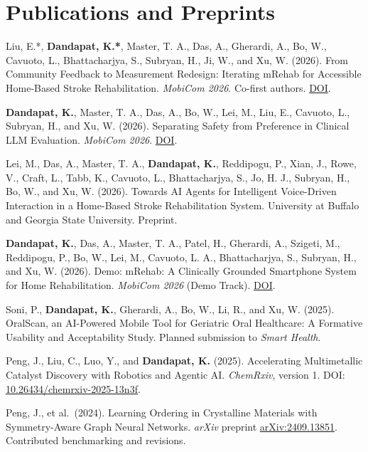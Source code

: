 \documentclass[11pt,a4paper]{article}
\begin{document}
\section*{Publications and Preprints}
\begin{cvlist}
  \item Liu, E.*, \textbf{Dandapat, K.*}, Master, T. A., Das, A., Gherardi, A., Bo, W., Cavuoto, L., Bhattacharjya, S., Subryan, H., Ji, W., and Xu, W. (2026). From Community Feedback to Measurement Redesign: Iterating mRehab for Accessible Home-Based Stroke Rehabilitation. \textit{MobiCom 2026}. Co-first authors. \href{https://doi.org/10.1145/3842436.3843796}{DOI}.

  \item \textbf{Dandapat, K.}, Master, T. A., Das, A., Bo, W., Lei, M., Liu, E., Cavuoto, L., Subryan, H., and Xu, W. (2026). Separating Safety from Preference in Clinical LLM Evaluation. \textit{MobiCom 2026}. \href{https://doi.org/10.1145/3842436.3843811}{DOI}.

  \item Lei, M., Das, A., Master, T. A., \textbf{Dandapat, K.}, Reddipogu, P., Xian, J., Rowe, V., Craft, L., Tabb, K., Cavuoto, L., Bhattacharjya, S., Jo, H. J., Subryan, H., Bo, W., and Xu, W. (2026). Towards AI Agents for Intelligent Voice-Driven Interaction in a Home-Based Stroke Rehabilitation System. University at Buffalo and Georgia State University. Preprint.

  \item \textbf{Dandapat, K.}, Das, A., Master, T. A., Patel, H., Gherardi, A., Szigeti, M., Reddipogu, P., Bo, W., Lei, M., Cavuoto, L. A., Bhattacharjya, S., Subryan, H., and Xu, W. (2026). Demo: mRehab: A Clinically Grounded Smartphone System for Home Rehabilitation. \textit{MobiCom 2026} (Demo Track). \href{https://doi.org/10.1145/3795866.3848473}{DOI}.

  \item Soni, P., \textbf{Dandapat, K.}, Gherardi, A., Bo, W., Li, R., and Xu, W. (2025). OralScan, an AI-Powered Mobile Tool for Geriatric Oral Healthcare: A Formative Usability and Acceptability Study. Planned submission to \textit{Smart Health}.

  \item Peng, J., Liu, C., Luo, Y., and \textbf{Dandapat, K.} (2025). Accelerating Multimetallic Catalyst Discovery with Robotics and Agentic AI. \textit{ChemRxiv}, version 1. DOI: \href{https://doi.org/10.26434/chemrxiv-2025-13n3f}{10.26434/chemrxiv-2025-13n3f}.

  \item Peng, J., et al.\ (2024). Learning Ordering in Crystalline Materials with Symmetry-Aware Graph Neural Networks. \textit{arXiv} preprint \href{https://arxiv.org/abs/2409.13851}{arXiv:2409.13851}. Contributed benchmarking and revisions.
\end{cvlist}
\end{document}
